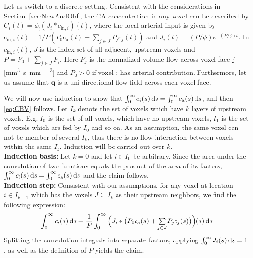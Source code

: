 \documentclass[final,5p,times,twocolumn]{elsarticle}
\begin{document}
	Let us switch to a discrete setting.
	Consistent with the considerations in Section~\ref{sec:NewAndOld}, the CA concentration in any voxel can be described by $C_i(t) = \phi_i(J_i\ast c_{\mathrm{in},i})(t)$, where the local arterial input is given by
		$c_{\mathrm{in},i}(t) =1/P(P_0 c_\mathrm{a}(t) + \sum_{j \in J} P_jc_j(t))$ and $J_i(t)=(P/\phi)e^{- (P/\phi)t}$.
	In $c_{\mathrm{in},i}(t)$, $J$ is the index set of all adjacent, upstream voxels and $P=P_0 + \sum_{j\in J} P_j$.
	Here $P_j$ is the normalized volume flow across voxel-face $j$ [\si{\milli\meter\cubed\per\second\per\milli\meter\cubed}] and $P_0>0$ if voxel $i$ has arterial contribution.
	Furthermore, let us assume that $\mathbf{q}$ is a uni-directional flow field across each voxel face.
	
		We will now use induction to show that $\int_0^\infty c_i(s) \,\mathrm{d} s = \int_0^\infty c_\mathrm{a}(s) \,\mathrm{d} s$, and then \eqref{eq:CBV} follows.
		Let $I_k$ denote the set of voxels which have $k$ layers of upstream voxels.
		E.g. $I_0$ is the set of all voxels, which have no upstream voxels, $I_1$ is the set of voxels which are fed by $I_0$ and so on. As an assumption, the same voxel can not be member of several $I_k$, thus there is no flow interaction between voxels within the same $I_k$.
		Induction will be carried out over $k$.\\
		\textbf{Induction basis:}
		Let $k=0$ and let $i \in I_0$ be arbitrary.
		Since the area under the convolution of two functions equals the product of the area of its factors, $\int_0^\infty c_i(s) \,\mathrm{d} s = \int_0^\infty c_\mathrm{a}(s) \,\mathrm{d} s$ and the claim follows.\\
		\textbf{Induction step:}
		Consistent with our assumptions, for any voxel at location $i \in I_{k+1}$ which has the voxels $J \subseteq I_{k}$ as their upstream neighbors, we find the following expression:
		\begin{equation}
			\int_0^\infty c_i(s) \,\mathrm{d} s = \frac{1}{P}\int_0^\infty \Big(J_i\ast \big( P_0 c_\mathrm{a}(s) + {\textstyle\sum\limits_{j \in J}}P_j c_j(s) \big)\Big)(s) \,\mathrm{d} s
		\end{equation}
		 Splitting the convolution integrals into separate factors, applying $\int_0^{\infty}J_i(s)\,\mathrm{d} s = 1$, as well as the definition of $P$ yields the claim.
	
\end{document}
